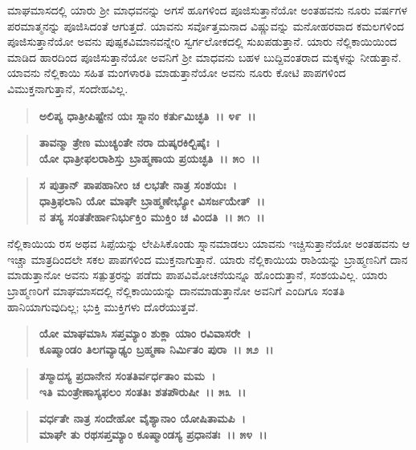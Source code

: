 ಮಾಘಮಾಸದಲ್ಲಿ ಯಾರು ಶ‍್ರೀ ಮಾಧವನನ್ನು ಅಗಸೆ ಹೂಗಳಿಂದ ಪೂಜಿಸುತ್ತಾನೆಯೋ ಅಂತಹವನು ನೂರು ವರ್ಷಗಳ ಪರಮಾತ್ಮನನ್ನು ಪೂಜಿಸಿದಂತೆ ಆಗುತ್ತದೆ. ಯಾವನು ಸರ್ವೊತ್ತಮನಾದ ವಿಷ್ಣುವನ್ನು ಮನೋಹರವಾದ ಕಮಲಗಳಿಂದ ಪೂಜಿಸುತ್ತಾನೆಯೋ ಅವನು ಪುಷ್ಪಕವಿಮಾನವನ್ನೇರಿ ಸ್ವರ್ಗಲೋಕದಲ್ಲಿ ಸುಖಪಡುತ್ತಾನೆ. ಯಾರು ನೆಲ್ಲಿಕಾಯಿಯಿಂದ ಮಾಡಿದ ಹಾರದಿಂದ ಪೂಜಿಸುತ್ತಾನೆಯೋ ಅವನಿಗೆ ಶ‍್ರೀ ಮಾಧವನು ಬಹಳ ಬುದ್ದಿವಂತರಾದ ಮಕ್ಕಳನ್ನು ನೀಡುತ್ತಾನೆ. ಯಾವನು ನೆಲ್ಲಿಕಾಯಿ ಸಹಿತ ಮಂಗಳಾರತಿ ಮಾಡುತ್ತಾನೆಯೋ ಅವನು ನೂರು ಕೋಟಿ ಪಾಪಗಳಿಂದ ವಿಮುಕ್ತನಾಗುತ್ತಾನೆ, ಸಂದೇಹವಿಲ್ಲ.

\begin{verse}
\textbf{ಅಲಿಪ್ಯ ಧಾತ್ರೀಪಿಷ್ಟೇನ ಯಃ ಸ್ನಾನಂ ಕರ್ತುಮಿಚ್ಛತಿ~।। ೪೯~।।} 
\end{verse}

\begin{verse}
\textbf{ತಾವನ್ಮಾ ತ್ರೇಣ ಮುಚ್ಯಂತೇ ನರಾ ದುಷ್ಕರಕಿಲ್ಬಿಷೈಃ~।}\\\textbf{ಯೋ ಧಾತ್ರೀಫಲರಾಶಿಸ್ತು ಬ್ರಾಹ್ಮಣಾಯ ಪ್ರಯಚ್ಛತಿ~।। ೫೦~।।}
\end{verse}

\begin{verse}
\textbf{ಸ ಪುತ್ರಾನ್ ಪಾಪಹಾನೀಂ ಚ ಲಭತೇ ನಾತ್ರ ಸಂಶಯಃ~।}\\\textbf{ಧಾತ್ರಿಫಲಾನಿ ಯೋ ಮಾಘೇ ಬ್ರಾಹ್ಮಣೇಭ್ಯೋ ವಿಸರ್ಜಯೇತ್~।।}\\\textbf{ನ ತಸ್ಯ ಸಂತತೇರ್ಹಾನಿರ್ಭುಕ್ತಿಂ ಮುಕ್ತಿಂ ಚ ವಿಂದತಿ~।। ೫೧~।।}
\end{verse}

ನೆಲ್ಲಿಕಾಯಿಯ ರಸ ಅಥವ ಸಿಪ್ಪೆಯನ್ನು ಲೇಪಿಸಿಕೊಂಡು ಸ್ನಾನಮಾಡಲು ಯಾವನು ಇಚ್ಚಿಸುತ್ತಾನೆಯೋ ಅಂತಹವನು ಆ ಇಚ್ಚಾ ಮಾತ್ರದಿಂದಲೇ ಸಕಲ ಪಾಪಗಳಿಂದ ಮುಕ್ತನಾಗುತ್ತಾನೆ. ಯಾರು ನೆಲ್ಲಿಕಾಯಿಯ ರಾಶಿಯನ್ನು ಬ್ರಾಹ್ಮಣನಿಗೆ ದಾನ ಮಾಡುತ್ತಾನೋ ಅವನು ಸತ್ಪುತ್ರರನ್ನು ಪಡೆದು ಪಾಪವಿಮೋಚನೆಯನ್ನೂ ಹೊಂದುತ್ತಾನೆ, ಸಂಶಯವಿಲ್ಲ. ಯಾರು ಬ್ರಾಹ್ಮಣರಿಗೆ ಮಾಘಮಾಸದಲ್ಲಿ ನೆಲ್ಲಿಕಾಯಿಯನ್ನು ದಾನಮಾಡುತ್ತಾನೋ ಅವನಿಗೆ ಎಂದಿಗೂ ಸಂತತಿ ಹಾನಿಯಾಗುವುದಿಲ್ಲ; ಭುಕ್ತಿ ಮುಕ್ತಿಗಳು ದೊರೆಯುತ್ತವೆ.

\begin{verse}
\textbf{ಯೋ ಮಾಘಮಾಸಿ ಸಪ್ತಮ್ಯಾಂ ಶುಕ್ಲಾ ಯಾಂ ರವಿವಾಸರೇ~।}\\\textbf{ಕೂಷ್ಮಾಂಡಂ ತಿಲಗವ್ಯಾಢ್ಯಂ ಬ್ರಹ್ಮಣಾ ನಿರ್ಮಿತಂ ಪುರಾ~।। ೫೨~।। }
\end{verse}

\begin{verse}
\textbf{ತಸ್ಮಾದಸ್ಯ ಪ್ರದಾನೇನ ಸಂತತಿರ್ವರ್ಧತಾಂ ಮಮ~।}\\\textbf{ಇತಿ ಮಂತ್ರೇಣಾಸ್ಯಫಲಂ ಸಂತತಿಃ ಶತಪೌರುಷೀ~।। ೫೩~।। }
\end{verse}

\begin{verse}
\textbf{ವರ್ಧತೇ ನಾತ್ರ ಸಂದೇಹೋ ವೈಶ್ಯಾನಾಂ ಯೋಷಿತಾಮಪಿ~।}\\\textbf{ಮಾಘೇ ತು ರಥಸಪ್ತಮ್ಯಾಂ ಕೂಷ್ಮಾಂಡಸ್ಯ ಪ್ರಧಾನತಃ~।। ೫೪~।। }
\end{verse}

